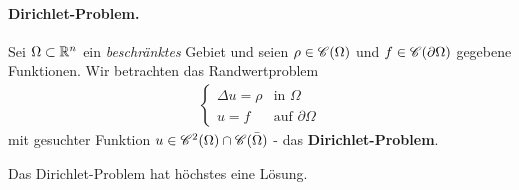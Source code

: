 \paragraph{Dirichlet-Problem. } Sei $\Omega \subset \mathbb{R}^n$ ein \textit{beschränktes} Gebiet und seien $\rho \in \mathscr{C}(\Omega)$ und $f \in \mathscr{C}(\partial \Omega)$ gegebene Funktionen. Wir betrachten das Randwertproblem
\begin{align*}
	\begin{cases}
		\Delta u = \rho & \text{in } \Omega\\
		u = f & \text{auf } \partial\Omega
	\end{cases}
\end{align*}
mit gesuchter Funktion $u \in \mathscr{C}^2(\Omega) \cap \mathscr{C}(\bar{\Omega})$ - das \textbf{Dirichlet-Problem}.
\begin{satz}
	Das Dirichlet-Problem hat höchstes eine Lösung.
\end{satz}

